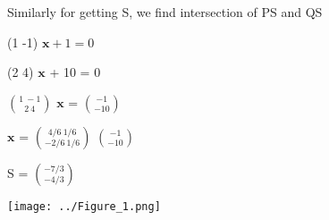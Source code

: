 \documentclass{beamer}
\begin{document}
 
 \begin{frame}
 Similarly for getting S, we find intersection of PS and QS
 
 
 \setlength{\parindent}{4cm}
 
\vspace{2 mm}
 (1  -1) $\boldsymbol{x}+1=0$


\vspace{2 mm}
(2   4) $\boldsymbol{x}$  +  10 = 0


\vspace{2 mm}
$\binom{1 \ -1}{2  \  4}$ $\boldsymbol{x}$ = $\binom{-1}{-10}$


\vspace{2 mm}
$\boldsymbol{x}$ = $\binom{4/6 \ 1/6}{-2/6  \  1/6}$ $\binom{-1}{-10}$

\vspace{2 mm}
S = $\binom{-7/3}{-4/3}$
 \end{frame}
 
 

\texttt{[image: ../Figure\_1.png]} 
\end{document}
